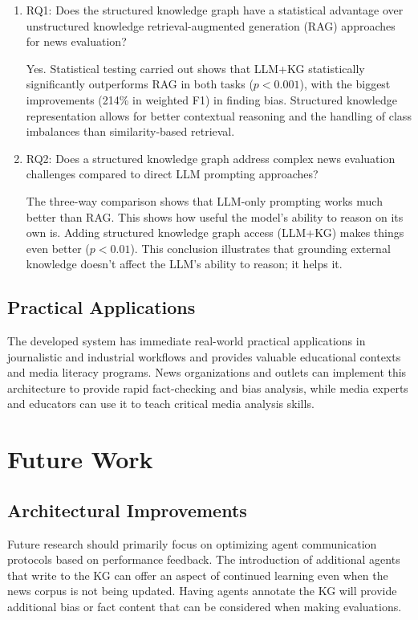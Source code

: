 \documentclass[11pt]{article}
\begin{document}
\begin{enumerate}
    \item RQ1: Does the structured knowledge graph have a statistical advantage over unstructured knowledge retrieval-augmented generation (RAG) approaches for news evaluation?

Yes. Statistical testing carried out shows that LLM+KG statistically significantly outperforms  RAG in both tasks ($p<0.001$), with the biggest improvements (214\% in weighted F1) in finding bias. Structured knowledge representation allows for better contextual reasoning and the handling of class imbalances than similarity-based retrieval.

\item RQ2: Does a structured knowledge graph address complex news evaluation challenges compared to direct LLM prompting approaches?

The three-way comparison shows that LLM-only prompting works much better than RAG. This shows how useful the model's ability to reason on its own is. Adding structured knowledge graph access (LLM+KG) makes things even better ($p<0.01$). This conclusion illustrates that grounding external knowledge doesn't affect the LLM's ability to reason; it helps it.
\end{enumerate}
\subsection{Practical Applications}
The developed system has immediate real-world practical applications in journalistic and industrial workflows and provides valuable educational contexts and media literacy programs. News organizations and outlets can implement this architecture to provide rapid fact-checking and bias analysis, while media experts and educators can use it to teach critical media analysis skills.



\section{Future Work}

\subsection{Architectural Improvements}
Future research should primarily focus on optimizing agent communication protocols based on performance feedback. The introduction of additional agents that write to the KG can offer an aspect of continued learning even when the news corpus is not being updated. Having agents annotate the KG will provide additional bias or fact content that can be considered when making evaluations.
\end{document}
